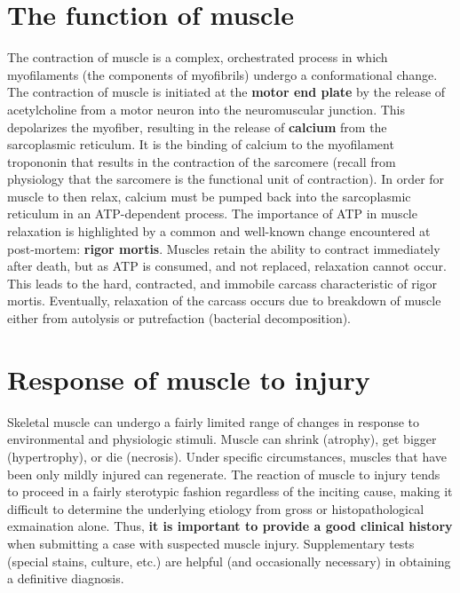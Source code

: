 \documentclass[openany]{book}
\begin{document}
\section{The function of muscle}\label{the-function-of-muscle}

The contraction of muscle is a complex, orchestrated process in which
myofilaments (the components of myofibrils) undergo a conformational
change. The contraction of muscle is initiated at the \textbf{motor end
plate} by the release of acetylcholine from a motor neuron into the
neuromuscular junction. This depolarizes the myofiber, resulting in the
release of \textbf{calcium} from the sarcoplasmic reticulum. It is the
binding of calcium to the myofilament tropononin that results in the
contraction of the sarcomere (recall from physiology that the sarcomere
is the functional unit of contraction). In order for muscle to then
relax, calcium must be pumped back into the sarcoplasmic reticulum in an
ATP-dependent process. The importance of ATP in muscle relaxation is
highlighted by a common and well-known change encountered at
post-mortem: \textbf{rigor mortis}. Muscles retain the ability to
contract immediately after death, but as ATP is consumed, and not
replaced, relaxation cannot occur. This leads to the hard, contracted,
and immobile carcass characteristic of rigor mortis. Eventually,
relaxation of the carcass occurs due to breakdown of muscle either from
autolysis or putrefaction (bacterial decomposition).

\section{Response of muscle to
injury}\label{response-of-muscle-to-injury}

Skeletal muscle can undergo a fairly limited range of changes in
response to environmental and physiologic stimuli. Muscle can shrink
(atrophy), get bigger (hypertrophy), or die (necrosis). Under specific
circumstances, muscles that have been only mildly injured can
regenerate. The reaction of muscle to injury tends to proceed in a
fairly sterotypic fashion regardless of the inciting cause, making it
difficult to determine the underlying etiology from gross or
histopathological exmaination alone. Thus, \textbf{it is important to
provide a good clinical history} when submitting a case with suspected
muscle injury. Supplementary tests (special stains, culture, etc.) are
helpful (and occasionally necessary) in obtaining a definitive
diagnosis.
\end{document}
